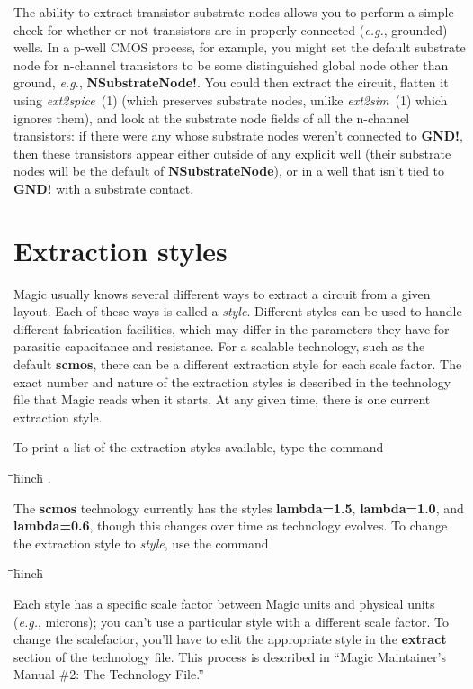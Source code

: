 \documentclass[letterpaper,twoside,12pt]{article}
\def\hinch{\hspace*{0.5in}}
\def\starti{\begin{center}\begin{tabbing}\hinch\=\hinch\=\hinch\=hinch\hinch\=\kill}
\def\endi{\end{tabbing}\end{center}}
\def\ii{\>\>\>}
\begin{document}
The ability to extract transistor substrate nodes allows you to perform
a simple check for whether or not transistors are in properly connected
({\itshape e.g.}, grounded) wells.  In a p-well CMOS process, for example, you
might set the default substrate node for n-channel transistors to be
some distinguished global node other than ground, {\itshape e.g.},
{\bfseries NSubstrateNode!}.  You could then extract the circuit, flatten
it using {\itshape ext2spice}~(1) (which preserves substrate nodes,
unlike {\itshape ext2sim}~(1) which ignores them), and
look at the substrate node fields of all the n-channel transistors:
if there were any whose substrate nodes weren't connected to {\bfseries GND!},
then these transistors appear either outside of any explicit well
(their substrate nodes will be the default of {\bfseries NSubstrateNode}),
or in a well that isn't tied to {\bfseries GND!} with a substrate contact.

\section{Extraction styles}

Magic usually knows several different ways to extract
a circuit from a given layout.
Each of these ways is called a {\itshape style}.
Different styles can be used to handle different
fabrication facilities, which may differ in the parameters
they have for parasitic capacitance and resistance.
For a scalable technology, such as the default {\bfseries scmos},
there can be a different extraction style for each scale factor.
The exact number and nature of the extraction styles is
described in the technology file that Magic reads when it starts.
At any given time, there is one current extraction style.

To print a list of the extraction styles available, type
the command

\starti
   \ii {\bfseries :extract style}.
\endi

The {\bfseries scmos} technology currently has the styles {\bfseries lambda=1.5}, 
{\bfseries lambda=1.0}, and {\bfseries lambda=0.6}, though this changes over time as
technology evolves.
To change the extraction style
to {\itshape style}, use the command

\starti
   \ii {\bfseries :extract style}{\itshape style}
\endi

Each style has a specific scale factor between Magic units and
physical units ({\itshape e.g.}, microns);  you can't use a
particular style with a different scale factor.  To change
the scalefactor, you'll have to edit the appropriate
style in the {\bfseries extract} section of the technology file.
This process is described in
``Magic Maintainer's Manual \#2: The Technology File.''
\end{document}
